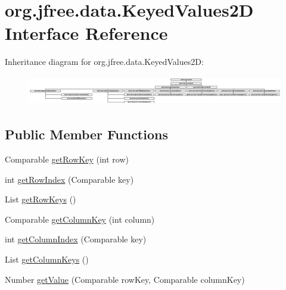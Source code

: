 \hypertarget{interfaceorg_1_1jfree_1_1data_1_1_keyed_values2_d}{}\section{org.\+jfree.\+data.\+Keyed\+Values2D Interface Reference}
\label{interfaceorg_1_1jfree_1_1data_1_1_keyed_values2_d}
Inheritance diagram for org.\+jfree.\+data.\+Keyed\+Values2D\+:\begin{figure}[H]
\begin{center}
\leavevmode
\includegraphics[height=1.306667cm]{interfaceorg_1_1jfree_1_1data_1_1_keyed_values2_d}
\end{center}
\end{figure}
\subsection*{Public Member Functions}
\begin{DoxyCompactItemize}
\item 
Comparable \mbox{\hyperlink{interfaceorg_1_1jfree_1_1data_1_1_keyed_values2_d_a7c145e2383036a479460e4bca7b40a95}{get\+Row\+Key}} (int row)
\item 
int \mbox{\hyperlink{interfaceorg_1_1jfree_1_1data_1_1_keyed_values2_d_ae92ded12999f2872687a5754ddf29254}{get\+Row\+Index}} (Comparable key)
\item 
List \mbox{\hyperlink{interfaceorg_1_1jfree_1_1data_1_1_keyed_values2_d_aeda9aab284e61f69ca6e81370e76f70a}{get\+Row\+Keys}} ()
\item 
Comparable \mbox{\hyperlink{interfaceorg_1_1jfree_1_1data_1_1_keyed_values2_d_a9ced6cbaf04f048db059e1ebf5184d2a}{get\+Column\+Key}} (int column)
\item 
int \mbox{\hyperlink{interfaceorg_1_1jfree_1_1data_1_1_keyed_values2_d_a3360f2f612f16e8c90409d65e3992d38}{get\+Column\+Index}} (Comparable key)
\item 
List \mbox{\hyperlink{interfaceorg_1_1jfree_1_1data_1_1_keyed_values2_d_af6b8780fee7cccdb967fc0f199398615}{get\+Column\+Keys}} ()
\item 
Number \mbox{\hyperlink{interfaceorg_1_1jfree_1_1data_1_1_keyed_values2_d_a61c450ca108cd99e53174fc91393a99a}{get\+Value}} (Comparable row\+Key, Comparable column\+Key)
\end{DoxyCompactItemize}


